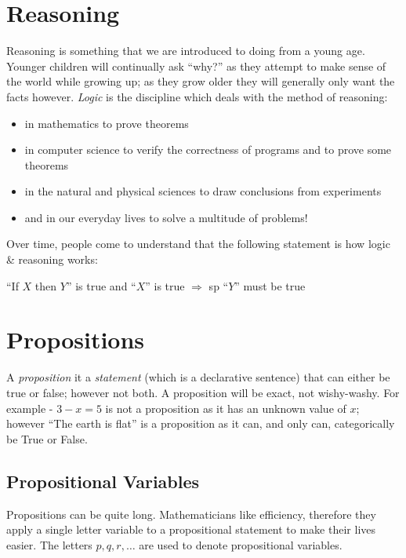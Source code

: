 
\section{Reasoning}
Reasoning is something that we are introduced to doing from a young age. Younger children will continually ask ``why?'' as they attempt to make sense of the world while growing up; as they grow older they will generally only want the facts however. \textit{Logic} is the discipline which deals with the method of reasoning:
\begin{itemize}
    \item in mathematics to prove theorems
    \item in computer science to verify the correctness of programs and to prove some theorems
    \item in the natural and physical sciences to draw conclusions from experiments
    \item and in our everyday lives to solve a multitude of problems!
\end{itemize}
Over time, people come to understand that the following statement is how logic \& reasoning works:
\begin{center}
    ``If $X$ then $Y$'' is true and ``$X$'' is true $\Rightarrow$ sp ``$Y$'' must be true
\end{center}

\section{Propositions}
A \textit{proposition} it a \textit{statement} (which is a declarative sentence) that can either be true or false; however not both. A proposition will be exact, not wishy-washy. For example - $3-x=5$ is not a proposition as it has an unknown value of $x$; however ``The earth is flat'' is a proposition as it can, and only can, categorically be True or False.\\

\subsection{Propositional Variables}
Propositions can be quite long. Mathematicians like efficiency, therefore they apply a single letter variable to a propositional statement to make their lives easier. The letters $p, q, r, \ldots$ are used to denote propositional variables.\\

